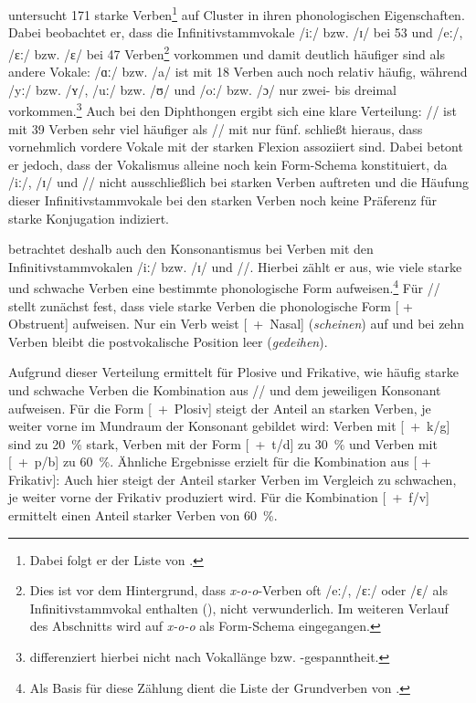 \textcite{Kopcke.1999} untersucht 171 starke Verben\footnote{Dabei folgt er der Liste von \textcite[197--198]{FabriciusHansen.1977}.} auf Cluster in ihren phonologischen Eigenschaften. Dabei beobachtet er, dass die Infinitivstammvokale /iː/ bzw. /ɪ/ bei 53 und /eː/, /ɛː/ bzw. /ɛ/ bei 47 Verben\footnote{Dies ist vor dem Hintergrund, dass \textit{x-o-o}-Verben oft /eː/, /ɛː/ oder /ɛ/ als Infinitivstammvokal enthalten (\cite[169]{Nowak.2018}), nicht verwunderlich. Im weiteren Verlauf des Abschnitts wird auf \textit{x-o-o} als Form-Schema eingegangen.} vorkommen und damit deutlich häufiger sind als andere Vokale: /ɑː/ bzw. /a/ ist mit 18 Verben auch noch relativ häufig, während /yː/ bzw. /ʏ/, /uː/ bzw. /ʊ/ und /oː/ bzw. /ɔ/ nur zwei- bis dreimal vorkommen.\footnote{\textcite[53]{Kopcke.1999} differenziert hierbei nicht nach Vokallänge bzw. -gespanntheit.} Auch bei den Diph\-thongen ergibt sich eine klare Verteilung: /{}/ ist mit 39 Verben sehr viel häufiger als /{}/ mit nur fünf. \textcite[53]{Kopcke.1999} schließt hieraus, dass vornehmlich vordere Vokale mit der starken Flexion assoziiert sind. Dabei betont er jedoch, dass der Vokalismus alleine noch kein Form-Schema konstituiert, da /iː/, /ɪ/ und /{}/ nicht ausschließlich bei starken Verben auftreten und die Häufung dieser Infinitivstammvokale bei den starken Verben noch keine Präferenz für starke Konjugation indiziert.

 

\textcite[53--56]{Kopcke.1999} betrachtet deshalb auch den Konsonantismus bei Verben mit den Infinitivstammvokalen /iː/ bzw. /ɪ/ und /{}/. Hierbei zählt er aus, wie viele starke und schwache Verben eine bestimmte phonologische Form aufweisen.\footnote{Als Basis für diese Zählung dient die Liste der Grundverben von \textcite{Mater.1967}.} Für /{}/ stellt \textcite[54]{Kopcke.1999} zunächst fest, dass viele starke Verben die phonologische Form [{} + Obstruent] aufweisen. Nur ein Verb weist  [{}~+~Nasal] (\textit{scheinen}) auf und bei zehn Verben bleibt die postvokalische Position leer (\textit{gedeihen}).



Aufgrund dieser Verteilung ermittelt \textcite[54--55]{Kopcke.1999} für Plosive und Frikative, wie häufig starke und schwache Verben die Kombination aus /{}/ und dem jeweiligen Konsonant aufweisen. Für die Form [{}~+~Plosiv] steigt der Anteil an starken Verben, je weiter vorne im Mundraum der Konsonant gebildet wird: Verben mit [{}~+~k/g] sind zu 20~\% stark, Verben mit der Form [{}~+~t/d] zu 30~\% und Verben mit [{}~+~p/b] zu 60~\%. Ähnliche Ergebnisse erzielt \textcite[55]{Kopcke.1999} für die Kombination aus [{} + Frikativ]: Auch hier steigt der Anteil starker Verben im Vergleich zu schwachen, je weiter vorne der Frikativ produziert wird. Für die Kombination [{}~+~f/v] ermittelt \textcite[55]{Kopcke.1999} einen Anteil starker Verben von 60~\%.

